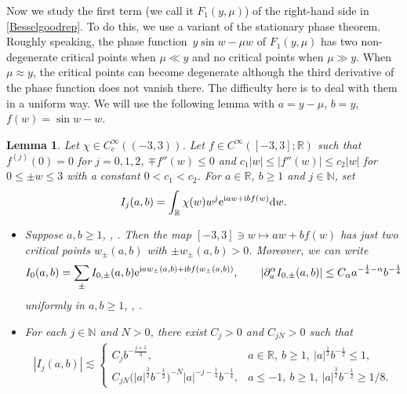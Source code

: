 \documentclass[pdftex]{sigma}
\numberwithin{equation}{section}
\newtheorem{Lemma}[Theorem]{Lemma}
\def\R{\mathbb{R}}%
\def\a{\alpha}
\def\m{\mu}
\def\pa{\partial}
\begin{document}
Now we study the first term (we call it $F_1(y,\m)$) of the right-hand side in \eqref{Besselgoodrep}. To do this, we use a variant of the stationary phase theorem. Roughly speaking, the phase function~${y\sin w-\m w}$ of $F_1(y,\m)$ has two non-degenerate critical points when $\m\ll y$ and no critical points when $\m\gg y$. When $\m \approx y$, the critical points can become degenerate although the third derivative of the phase function does not vanish there.
The difficulty here is to deal with them in a uniform way. We will use the following lemma with $a=y-\m$, $b=y$, $f(w)=\sin w-w$.

\begin{Lemma}\label{appstphasevai}
Let $\chi\in C_c^{\infty}((-3,3))$. Let $f\in C^{\infty}([-3,3];\R)$ such that $f^{(j)}(0)=0$ for $j=0,1,2$, $\mp f''(w)\leq 0$ and $c_1|w|\leq |f''(w)|\leq c_2|w|$ for $0\leq \pm w\leq 3$ with a constant $0<c_1<c_2$. For $a\in \R$, $b\geq 1$ and $j\in\mathbb{N}$, set
\begin{align}\label{appI_jdef}
I_j(a,b)=\int_{\R}\chi(w)w^j{\rm e}^{{\rm i}aw+{\rm i}bf(w)}{\rm d}w.
\end{align}

\begin{itemize}\itemsep=0pt
\item[$(i)$] Suppose $a,b\geq 1$, , . Then the map $[-3,3]\ni w\mapsto aw+bf(w)$ has just two critical points $w_{\pm}(a,b)$ with $\pm w_{\pm}(a,b)>0$. Moreover, we can write
\begin{align*}
I_0(a,b)=\sum_{\pm}I_{0,\pm}(a,b){\rm e}^{{\rm i} a w_{\pm}(a,b)+{\rm i}bf(w_{\pm}(a,b))},\qquad |\pa_a^{\a}I_{0,\pm}(a,b)|\leq C_{\a}a^{-\frac{1}{4}-\a}b^{-\frac{1}{4}}
\end{align*}
uniformly in $a,b\geq 1$, , .

\item[$(ii)$] For each $j\in\mathbb{N}$ and $N>0$, there exist $C_j>0$ and $C_{jN}>0$ such that
\begin{align*}
|I_j(a,b)|\lesssim \begin{cases}
C_jb^{-\frac{j+1}{3}}, & a\in \R,\  b\geq 1,\  |a|^{\frac{1}{2}}b^{-\frac{1}{2}}\leq 1, \\
C_{jN}\bigl(|a|^{\frac{3}{2}}b^{-\frac{1}{2}}\bigr)^{-N}|a|^{-j-\frac{1}{4}}b^{-\frac{1}{4}},&  a\leq -1,\  b\geq 1,\
  |a|^{\frac{3}{2}}b^{-\frac{1}{2}}\geq 1/8.
\end{cases}
\end{align*}
\end{itemize}
\end{Lemma}
\end{document}
